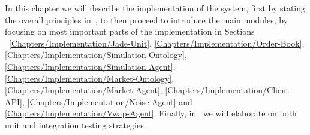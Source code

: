 In this chapter we will describe the implementation of the system, first by stating the overall principles in~, to then proceed to introduce the main modules, by focusing on most important parts of the implementation in Sections ~\ref{Chapters/Implementation/Jade-Unit}, \ref{Chapters/Implementation/Order-Book}, \ref{Chapters/Implementation/Simulation-Ontology}, \ref{Chapters/Implementation/Simulation-Agent}, \ref{Chapters/Implementation/Market-Ontology}, \ref{Chapters/Implementation/Market-Agent}, \ref{Chapters/Implementation/Client-API}, \ref{Chapters/Implementation/Noise-Agent} and \ref{Chapters/Implementation/Vwap-Agent}. Finally, in~ we will elaborate on both unit and integration testing strategies.